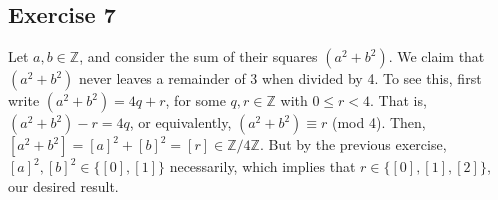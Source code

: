 \subsection*{Exercise 7}
Let $a,b \in \mathbb{Z}$, and consider the sum of their squares $(a^2 + b^2)$. We claim that $(a^2 + b^2)$ never leaves a remainder of 3 when divided by 4. To see this, first write $(a^2 + b^2) = 4q + r$, for some $q, r \in \mathbb{Z}$ with $0 \le r < 4$. That is, $(a^2 + b^2) - r = 4q$, or equivalently, $(a^2 + b^2) \equiv r$ (mod 4). Then, $[a^2 + b^2] = [a]^2 + [b]^2 = [r] \in \mathbb{Z}/4\mathbb{Z}$. But by the previous exercise, $[a]^2, [b]^2 \in \{[0],[1]\}$ necessarily, which implies that $r \in \{[0],[1],[2]\}$, our desired result. 